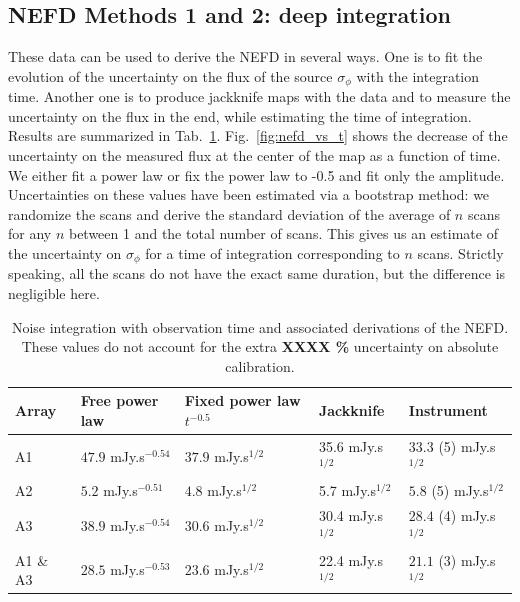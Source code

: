\subsection{NEFD Methods 1 and 2: deep integration}

These data can be used to derive the NEFD in several ways. One is to fit the
evolution of the uncertainty on the flux of the source $\sigma_\phi$ with the
integration time. Another one is to produce jackknife maps with the data and to
measure the uncertainty on the flux in the end, while estimating the time of
integration. Results are summarized in
Tab.~\ref{tab:nefd}. Fig.~\ref{fig:nefd_vs_t} shows the decrease of the
uncertainty on the measured flux at the center of the map as a function of
time. We either fit a power law or fix the power law to -0.5 and fit only the
amplitude. Uncertainties on these values have been estimated via a bootstrap
method: we randomize the scans and derive the standard deviation of the average
of $n$ scans for any $n$ between 1 and the total number of scans. This gives us
an estimate of the uncertainty on $\sigma_\phi$ for a time of integration
corresponding to $n$ scans. Strictly speaking, all the scans do not have the
exact same duration, but the difference is negligible here.

\begin{table}
\begin{tabular}{|l|l|l|l|l|}
\hline
Array & Free power law & Fixed power law $t^{-0.5}$ & Jackknife & Instrument \\
\hline
A1       & $47.9$ mJy.s$^{-0.54}$ & $37.9$ mJy.s$^{1/2}$ & 35.6 mJy.s$^{1/2}$ & $33.3$ (5) mJy.s$^{1/2}$\\
A2       & $5.2$  mJy.s$^{-0.51}$ & $4.8$  mJy.s$^{1/2}$ & 5.7  mJy.s$^{1/2}$ & $5.8$  (5) mJy.s$^{1/2}$\\
A3       & $38.9$ mJy.s$^{-0.54}$ & $30.6$ mJy.s$^{1/2}$ & 30.4 mJy.s$^{1/2}$ & $28.4$ (4) mJy.s$^{1/2}$\\
A1 \& A3 & $28.5$ mJy.s$^{-0.53}$ & $23.6$ mJy.s$^{1/2}$ & 22.4 mJy.s$^{1/2}$ & $21.1$ (3) mJy.s$^{1/2}$\\
\hline
\end{tabular}
\label{tab:nefd}
\caption{Noise integration with observation time and associated derivations of
  the NEFD. These values do not account for the extra {\color{red} \bf XXXX \%}
  uncertainty on absolute calibration.}
\end{table}


